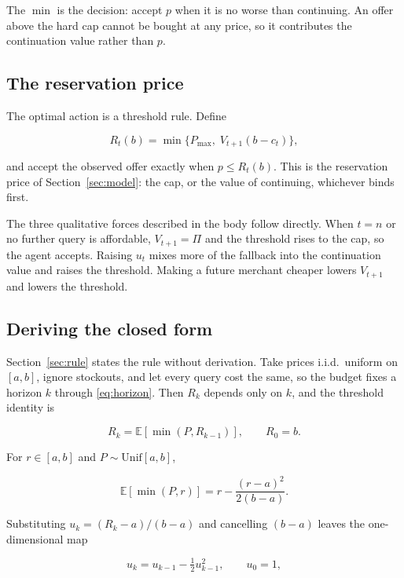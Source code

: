 The $\min$ is the decision: accept $p$ when it is no worse than continuing. An offer
above the hard cap cannot be bought at any price, so it contributes the continuation
value rather than $p$.

\subsection{The reservation price}

The optimal action is a threshold rule. Define

\begin{equation}
  R_t(b) = \min\{P_{\max},\; V_{t+1}(b - c_t)\},
\end{equation}

and accept the observed offer exactly when $p \le R_t(b)$. This is the reservation
price of Section~\ref{sec:model}: the cap, or the value of continuing, whichever
binds first.

The three qualitative forces described in the body follow directly. When $t = n$ or
no further query is affordable, $V_{t+1} = \Pi$ and the threshold rises to the cap,
so the agent accepts. Raising $u_t$ mixes more of the fallback into the continuation
value and raises the threshold. Making a future merchant cheaper lowers $V_{t+1}$ and
lowers the threshold.

\subsection{Deriving the closed form}

Section~\ref{sec:rule} states the rule without derivation. Take prices i.i.d.\
uniform on $[a, b]$, ignore stockouts, and let every query cost the same, so the
budget fixes a horizon $k$ through \eqref{eq:horizon}. Then $R_k$ depends only on
$k$, and the threshold identity is

\begin{equation}
  R_k = \mathbb{E}\!\left[\min(P, R_{k-1})\right],
  \qquad R_0 = b .
\end{equation}

For $r \in [a,b]$ and $P \sim \mathrm{Unif}[a,b]$,

\begin{equation}
  \mathbb{E}[\min(P, r)]
  = r - \frac{(r-a)^2}{2(b-a)} .
\end{equation}

Substituting $u_k = (R_k - a)/(b-a)$ and cancelling $(b-a)$ leaves the
one-dimensional map

\begin{equation}
  u_k = u_{k-1} - \tfrac{1}{2} u_{k-1}^2, \qquad u_0 = 1,
\end{equation}

